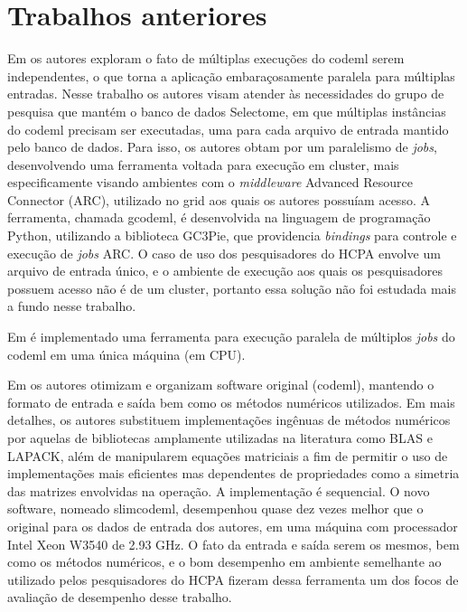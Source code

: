 \documentclass[cic,tc]{iiufrgs}
\begin{document}
\section{Trabalhos anteriores}

Em \cite{moretti2012gcodeml} os autores exploram o fato de múltiplas execuções
do codeml serem independentes, o que torna a aplicação embaraçosamente
paralela para múltiplas entradas. Nesse trabalho os autores visam atender às
necessidades do grupo de pesquisa que mantém o banco de dados Selectome, em
que múltiplas instâncias do codeml precisam ser executadas, uma para cada
arquivo de entrada mantido pelo banco de dados. Para isso, os autores obtam
por um paralelismo de \textit{jobs}, desenvolvendo uma ferramenta voltada
para execução em cluster, mais especificamente visando ambientes com o
\textit{middleware} Advanced Resource Connector (ARC), utilizado no grid aos
quais os autores possuíam acesso. A ferramenta, chamada gcodeml, é desenvolvida
na linguagem de programação Python, utilizando a biblioteca GC3Pie, que
providencia \textit{bindings} para controle e execução de \textit{jobs} ARC. O
caso de uso dos pesquisadores do HCPA envolve um arquivo de entrada único, e
o ambiente de execução aos quais os pesquisadores possuem acesso não é de um
cluster, portanto essa solução não foi estudada mais a fundo nesse trabalho.

Em \cite{maldonado2016lmap} é implementado uma
ferramenta para execução paralela de múltiplos \textit{jobs} do codeml
em uma única máquina (em CPU). %

Em \cite{schabauer2012slimcodeml} os autores otimizam e organizam software
original (codeml), mantendo o formato de entrada e saída bem como os métodos
numéricos utilizados. Em mais detalhes, os autores substituem implementações
ingênuas de métodos numéricos por aquelas de bibliotecas amplamente utilizadas
na literatura como BLAS e LAPACK, além de manipularem equações matriciais a fim
de permitir o uso de implementações mais eficientes mas dependentes de
propriedades como a simetria das matrizes envolvidas na operação. A
implementação é sequencial. O novo software, nomeado slimcodeml, desempenhou
quase dez vezes melhor que o original para os dados de entrada dos autores, em
uma máquina com processador Intel Xeon W3540 de 2.93 GHz. O fato da entrada e
saída serem os mesmos, bem como os métodos numéricos, e o bom desempenho em
ambiente semelhante ao utilizado pelos pesquisadores do HCPA fizeram dessa
ferramenta um dos focos de avaliação de desempenho desse trabalho.
\end{document}
